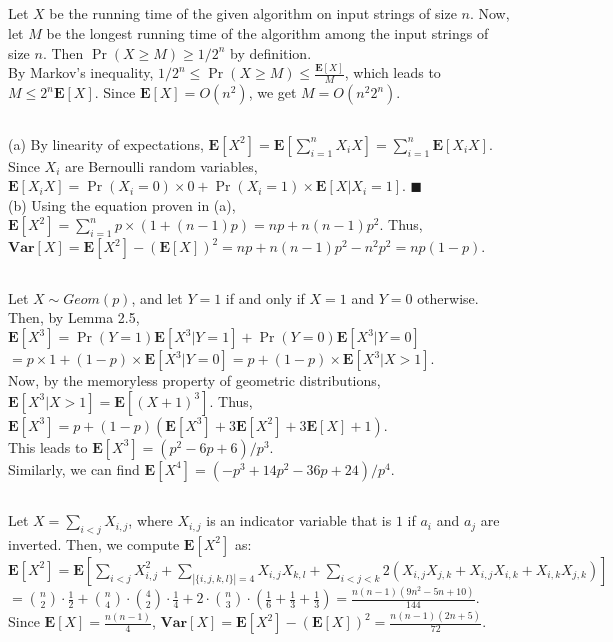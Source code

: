 \documentclass{article}
\begin{document}
\subsection{}
Let $X$ be the running time of the given algorithm on input strings of size $n$.
Now, let $M$ be the longest running time of the algorithm among the input strings of size $n$. Then $\Pr(X\geq M) \geq 1/2^n$ by definition.\\
By Markov's inequality, $1/2^n \leq \Pr(X\geq M) \leq \frac{\textbf{E}[X]}{M}$, which leads to $M \leq 2^n \textbf{E}[X]$.
Since $\textbf{E}[X]=O(n^2)$, we get $M=O(n^2 2^n)$.
\subsection{}
(a) By linearity of expectations, $\textbf{E}[X^2]=\textbf{E}[\sum\limits_{i=1}^nX_i X]=\sum\limits_{i=1}^n\textbf{E}[X_iX]$.\\
Since $X_i$ are Bernoulli random variables, $\textbf{E}[X_iX]=\Pr(X_i=0)\times 0+\Pr(X_i=1)\times \textbf{E}[X|X_i=1]$. $\blacksquare$\\
(b) Using the equation proven in (a), $\textbf{E}[X^2]=\sum\limits_{i=1}^np\times(1+(n-1)p)=np+n(n-1)p^2$.
Thus, $\textbf{Var}[X]=\textbf{E}[X^2]-(\textbf{E}[X])^2=np+n(n-1)p^2-n^2p^2=np(1-p)$.
\subsection{}
Let $X\sim Geom(p)$, and let $Y=1$ if and only if $X=1$ and $Y=0$ otherwise. Then, by Lemma 2.5,
$\textbf{E}[X^3]=\Pr(Y=1)\textbf{E}[X^3|Y=1]+\Pr(Y=0)\textbf{E}[X^3|Y=0]$\\
$=p\times 1 + (1-p)\times \textbf{E}[X^3|Y=0]=p+(1-p)\times\textbf{E}[X^3|X>1]$.\\
Now, by the memoryless property of geometric distributions, $\textbf{E}[X^3|X>1]=\textbf{E}[(X+1)^3]$.
Thus, $\textbf{E}[X^3]=p+(1-p)(\textbf{E}[X^3]+3\textbf{E}[X^2]+3\textbf{E}[X]+1)$.\\
This leads to $\textbf{E}[X^3]=(p^2-6p+6)/p^3$.\\
Similarly, we can find $\textbf{E}[X^4]=(-p^3+14p^2-36p+24)/p^4$.
\subsection{}
Let $X=\sum\limits_{i<j} X_{i,j}$, where $X_{i,j}$ is an indicator variable that is $1$ if $a_i$ and $a_j$ are inverted. Then, we compute $\textbf{E}[X^2]$ as:\\
$\textbf{E}[X^2]=\textbf{E}[\sum\limits_{i<j}X_{i,j}^2 +\sum\limits_{|\{i,j,k,l\}|=4}X_{i,j}X_{k,l} + \sum\limits_{i<j<k}2(X_{i,j}X_{j,k}+X_{i,j}X_{i,k}+X_{i,k}X_{j,k})]$
$=\binom{n}{2}\cdot\frac{1}{2}+\binom{n}{4}\cdot\binom{4}{2}\cdot\frac{1}{4}+2\cdot\binom{n}{3}\cdot\left( \frac{1}{6}+\frac{1}{3}+\frac{1}{3}\right)=\frac{n(n-1)(9n^2-5n+10)}{144}$.\\
Since $\textbf{E}[X]=\frac{n(n-1)}{4}$, $\textbf{Var}[X]=\textbf{E}[X^2]-(\textbf{E}[X])^2=\frac{n(n-1)(2n+5)}{72}$.
\end{document}
